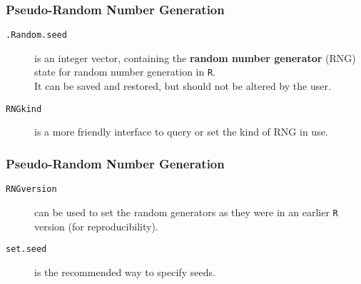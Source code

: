 \documentclass[MAIN.tex]{subfiles}
\begin{document}
 
	
\begin{frame}[fragile]
	\frametitle{Pseudo-Random Number Generation}
	\begin{description}		
	\item[\texttt{.Random.seed}] is an integer vector, containing the \textbf{random number generator} (RNG) state for random number generation in \texttt{R}.\\ It can be saved and restored, but should not be altered by the user.
	
	\item[\texttt{RNGkind}] is a more friendly interface to query or set the kind of RNG in use.
	\end{description}
\end{frame}
\begin{frame}
		\frametitle{Pseudo-Random Number Generation}
		\begin{description}	
\item[\texttt{RNGversion}] can be used to set the random generators as they were in an earlier \texttt{R} version (for reproducibility).
	
\item[\texttt{set.seed}] is the recommended way to specify seeds.
	\end{description}
\end{frame}
\end{document}
